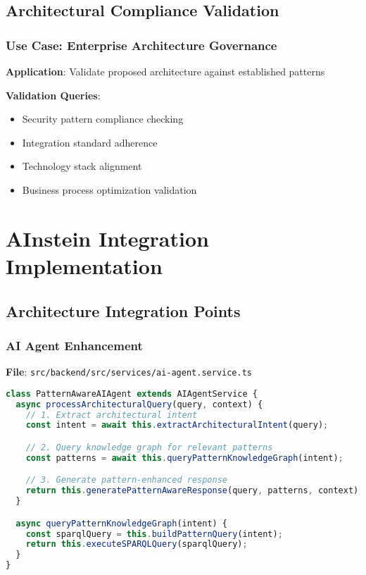 \documentclass[12pt,a4paper]{article}
\begin{document}
\subsection{Architectural Compliance Validation}

\subsubsection{Use Case: Enterprise Architecture Governance}
\textbf{Application}: Validate proposed architecture against established patterns

\textbf{Validation Queries}:
\begin{itemize}
    \item Security pattern compliance checking
    \item Integration standard adherence
    \item Technology stack alignment
    \item Business process optimization validation
\end{itemize}

\section{AInstein Integration Implementation}

\subsection{Architecture Integration Points}

\subsubsection{AI Agent Enhancement}
\textbf{File}: \texttt{src/backend/src/services/ai-agent.service.ts}

\begin{lstlisting}[language=JavaScript,caption=Pattern-Aware Query Processing]
class PatternAwareAIAgent extends AIAgentService {
  async processArchitecturalQuery(query, context) {
    // 1. Extract architectural intent
    const intent = await this.extractArchitecturalIntent(query);

    // 2. Query knowledge graph for relevant patterns
    const patterns = await this.queryPatternKnowledgeGraph(intent);

    // 3. Generate pattern-enhanced response
    return this.generatePatternAwareResponse(query, patterns, context);
  }

  async queryPatternKnowledgeGraph(intent) {
    const sparqlQuery = this.buildPatternQuery(intent);
    return this.executeSPARQLQuery(sparqlQuery);
  }
}
\end{lstlisting}
\end{document}
